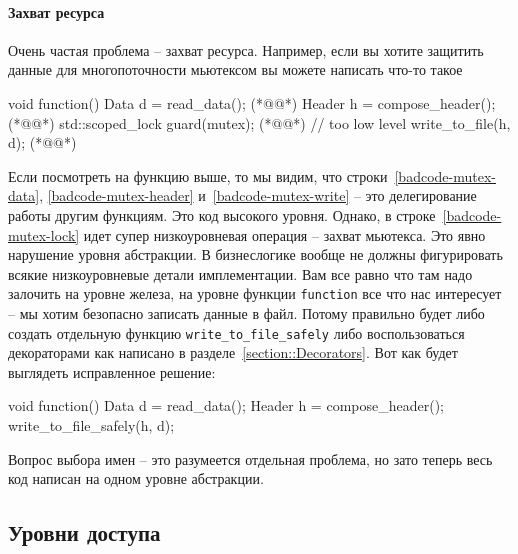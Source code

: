 \paragraph{Захват ресурса}

Очень частая проблема -- захват ресурса.
Например, если вы хотите защитить данные для многопоточности мьютексом вы можете написать что-то такое
\begin{cppcode}
void function() {
  Data d = read_data(); (*@@*)
  Header h = compose_header(); (*@@*)
  std::scoped_lock guard(mutex); (*@@*) // too low level
  write_to_file(h, d); (*@@*)
}
\end{cppcode}
Если посмотреть на функцию выше, то мы видим, что строки~\ref{badcode-mutex-data}, \ref{badcode-mutex-header} и~\ref{badcode-mutex-write} -- это делегирование работы другим функциям.
Это код высокого уровня.
Однако, в строке~\ref{badcode-mutex-lock} идет супер низкоуровневая операция -- захват мьютекса.
Это явно нарушение уровня абстракции.
В бизнеслогике вообще не должны фигурировать всякие низкоуровневые детали имплементации.
Вам все равно что там надо залочить на уровне железа, на уровне функции \verb"function" все что нас интересует -- мы хотим безопасно записать данные в файл.
Потому правильно будет либо создать отдельную функцию \verb"write_to_file_safely" либо воспользоваться декораторами как написано в разделе~\ref{section::Decorators}.
Вот как будет выглядеть исправленное решение:
\begin{cppcode}
void function() {
  Data d = read_data();
  Header h = compose_header();
  write_to_file_safely(h, d);
}
\end{cppcode}
Вопрос выбора имен -- это разумеется отдельная проблема, но зато теперь весь код написан на одном уровне абстракции.

\subsection{Уровни доступа}
\label{section::AccessLevels}


